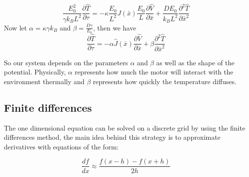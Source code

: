 \begin{equation}
\frac{E_0^2}{\gamma k_B L^2} \frac{\partial \hat{T}}{\partial \tau} = -\kappa \frac{E_0}{L^2}\hat{J}(\bar{x}) \frac{E_0}{L} \frac{\partial \hat{V}}{\partial \bar{x}} + \frac{D E_0}{k_B L^2} \frac{\partial^2 \hat{T}}{\partial \bar{x}^2}
\end{equation}
Now let $\alpha = \kappa \gamma k_B$ and $\beta = \frac{D \gamma}{E_0}$, then we have
\begin{equation}
\frac{\partial \hat{T}}{\partial \tau} = -\alpha \hat{J}(\bar{x}) \frac{\partial \hat{V}}{\partial \bar{x}} + \beta \frac{\partial^2 \hat{T}}{\partial \bar{x}^2}
\end{equation}

So our system depends on the parameters $\alpha$ and $\beta$ as well as the shape of the potential. Physically, $\alpha$ represents how much the motor will interact with the environment thermally and $\beta$ represents how quickly the temperature diffuses.

\subsection{Finite differences}
The one dimensional equation can be solved on a discrete grid by using the finite differences method, the main idea behind this strategy is to approximate derivatives with equations of the form:

\begin{equation}
\frac{d f}{d x} \approx \frac{f(x - h) - f(x + h)}{2h}
\end{equation}

